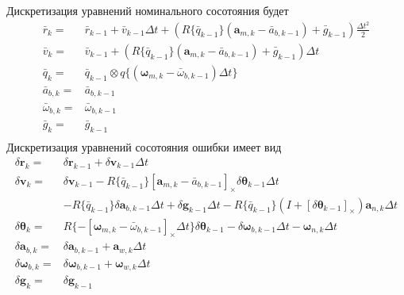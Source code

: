 \documentclass[12pt]{article}
\begin{document}
Дискретизация уравнений номинального сосотояния будет
\begin{equation}
    \begin{aligned}
        \bar{r}_k=          & \bar{r}_{k-1} + \bar{v}_{k-1} \Delta t
        + (R\{\bar{q}_{k-1}\} (\pmb{a}_{m,k} - \bar{a}_{b,k-1})
        + \bar{g}_{k-1}) \frac{\Delta t^2}{2}                                                                                 \\
        \bar{v}_k=          & \bar{v}_{k-1} + (R\{\bar{q}_{k-1}\} (\pmb{a}_{m,k} - \bar{a}_{b,k-1}) + \bar{g}_{k-1}) \Delta t \\
        \bar{q}_k=          & \bar{q}_{k-1} \otimes q\{(\pmb{\omega}_{m,k} - \bar{\omega}_{b,k-1})\Delta t\}                  \\
        \bar{a}_{b,k}=      & \bar{a}_{b,k-1}                                                                                 \\
        \bar{\omega}_{b,k}= & \bar{\omega}_{b,k-1}                                                                            \\
        \bar{g}_{k}=        & \bar{g}_{k-1}                                                                                   \\
    \end{aligned}
\end{equation}
Дискретизация уравнений сосотояния ошибки имеет вид
\begin{equation}
    \begin{aligned}
        \delta\pmb{r}_k=          & \delta\pmb{r}_{k-1} + \delta\pmb{v}_{k-1} \Delta t                                          \\
        \delta\pmb{v}_k=          & \delta \pmb{v}_{k-1}
        - R\{\bar{q}_{k-1}\} [\pmb{a}_{m, k} - \bar{a}_{b, k-1}]_\times\delta\pmb{\theta}_{k-1} \Delta t                        \\
                                  & - R\{\bar{q}_{k-1}\} \delta\pmb{a}_{b,k-1} \Delta t
        + \delta\pmb{g}_{k-1} \Delta t
        - R\{\bar{q}_{k-1}\}(I+[\delta\pmb{\theta}_{k-1}]_\times) \pmb{a}_{n,k} \Delta t                                        \\
        \delta\pmb{\theta}_k=     & R\{-[\pmb{\omega}_{m,k} - \bar{\omega}_{b,k-1}]_\times \Delta t\} \delta \pmb{\theta}_{k-1}
        - \delta \pmb{\omega}_{b,k-1} \Delta t
        - \pmb{\omega}_{n,k} \Delta t                                                                                           \\
        \delta\pmb{a}_{b,k}=      & \delta\pmb{a}_{b,k-1} + \pmb{a}_{w, k} \Delta t                                             \\
        \delta\pmb{\omega}_{b,k}= & \delta\pmb{\omega}_{b,k-1} + \pmb{\omega}_{w,k} \Delta t                                    \\
        \delta\pmb{g}_k=          & \delta\pmb{g}_{k-1}                                                                         \\
    \end{aligned}
\end{equation}
\end{document}
